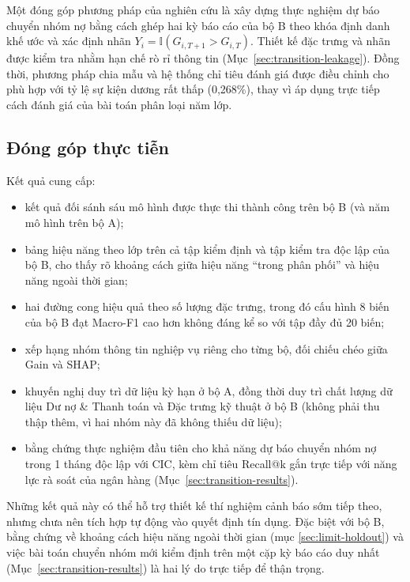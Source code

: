 Một đóng góp phương pháp của nghiên cứu là xây dựng thực nghiệm dự báo chuyển nhóm nợ bằng cách ghép hai kỳ báo cáo của bộ B theo khóa định danh khế ước và xác định nhãn $Y_i=\mathbb{I}(G_{i,T+1}>G_{i,T})$. Thiết kế đặc trưng và nhãn được kiểm tra nhằm hạn chế rò rỉ thông tin (Mục~\ref{sec:transition-leakage}). Đồng thời, phương pháp chia mẫu và hệ thống chỉ tiêu đánh giá được điều chỉnh cho phù hợp với tỷ lệ sự kiện dương rất thấp (0,268\%), thay vì áp dụng trực tiếp cách đánh giá của bài toán phân loại năm lớp.

\subsection{Đóng góp thực tiễn}

Kết quả cung cấp:

\begin{itemize}
    \item kết quả đối sánh sáu mô hình được thực thi thành công trên bộ B (và năm mô hình trên bộ A);
    \item bảng hiệu năng theo lớp trên cả tập kiểm định và tập kiểm tra độc lập của bộ B, cho thấy rõ khoảng cách giữa hiệu năng ``trong phân phối'' và hiệu năng ngoài thời gian;
    \item hai đường cong hiệu quả theo số lượng đặc trưng, trong đó cấu hình 8 biến của bộ B đạt Macro-F1 cao hơn không đáng kể so với tập đầy đủ 20 biến;
    \item xếp hạng nhóm thông tin nghiệp vụ riêng cho từng bộ, đối chiếu chéo giữa Gain và SHAP;
    \item khuyến nghị duy trì dữ liệu kỳ hạn ở bộ A, đồng thời duy trì chất lượng dữ liệu Dư nợ \& Thanh toán và Đặc trưng kỹ thuật ở bộ B (không phải thu thập thêm, vì hai nhóm này đã không thiếu dữ liệu);
    \item bằng chứng thực nghiệm đầu tiên cho khả năng dự báo chuyển nhóm nợ trong 1 tháng độc lập với CIC, kèm chỉ tiêu Recall@k gắn trực tiếp với năng lực rà soát của ngân hàng (Mục~\ref{sec:transition-results}).
\end{itemize}

Những kết quả này có thể hỗ trợ thiết kế thí nghiệm cảnh báo sớm tiếp theo, nhưng chưa nên tích hợp tự động vào quyết định tín dụng. Đặc biệt với bộ B, bằng chứng về khoảng cách hiệu năng ngoài thời gian (mục \ref{sec:limit-holdout}) và việc bài toán chuyển nhóm mới kiểm định trên một cặp kỳ báo cáo duy nhất (Mục~\ref{sec:transition-results}) là hai lý do trực tiếp để thận trọng.

